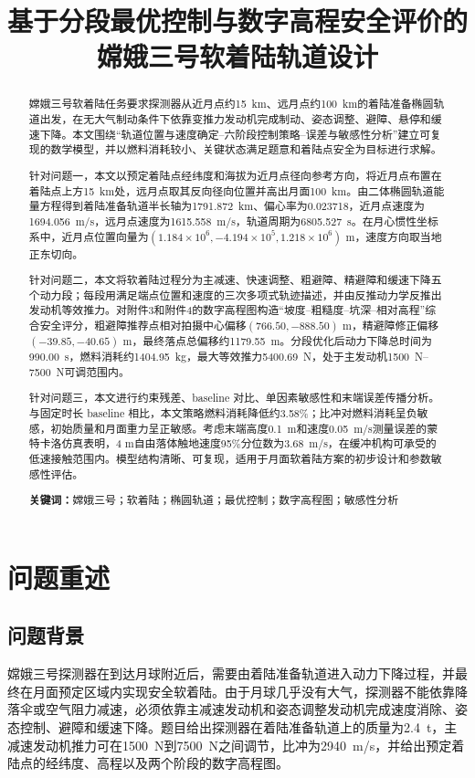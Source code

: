 \documentclass[UTF8,a4paper,12pt]{ctexart}
\title{\heiti 基于分段最优控制与数字高程安全评价的\\嫦娥三号软着陆轨道设计}
\author{}
\date{}
\begin{document}
\maketitle
\thispagestyle{empty}

\begin{abstract}
嫦娥三号软着陆任务要求探测器从近月点约\SI{15}{km}、远月点约\SI{100}{km}的着陆准备椭圆轨道出发，在无大气制动条件下依靠变推力发动机完成制动、姿态调整、避障、悬停和缓速下降。本文围绕``轨道位置与速度确定--六阶段控制策略--误差与敏感性分析''建立可复现的数学模型，并以燃料消耗较小、关键状态满足题意和着陆点安全为目标进行求解。

针对问题一，本文以预定着陆点经纬度和海拔为近月点径向参考方向，将近月点布置在着陆点上方\SI{15}{km}处，远月点取其反向径向位置并高出月面\SI{100}{km}。由二体椭圆轨道能量方程得到着陆准备轨道半长轴为\SI{1791.872}{km}、偏心率为0.023718，近月点速度为\SI{1694.056}{m/s}，远月点速度为\SI{1615.558}{m/s}，轨道周期为\SI{6805.527}{s}。在月心惯性坐标系中，近月点位置向量为$(1.184\times10^6,-4.194\times10^5,1.218\times10^6)$ m，速度方向取当地正东切向。

针对问题二，本文将软着陆过程分为主减速、快速调整、粗避障、精避障和缓速下降五个动力段；每段用满足端点位置和速度的三次多项式轨迹描述，并由反推动力学反推出发动机等效推力。对附件3和附件4的数字高程图构造``坡度--粗糙度--坑深--相对高程''综合安全评分，粗避障推荐点相对拍摄中心偏移$(766.50,-888.50)$ m，精避障修正偏移$(-39.85,-40.65)$ m，最终落点总偏移约\SI{1179.55}{m}。分段优化后动力下降总时间为\SI{990.00}{s}，燃料消耗约\SI{1404.95}{kg}，最大等效推力\SI{5400.69}{N}，处于主发动机\SI{1500}{N}--\SI{7500}{N}可调范围内。

针对问题三，本文进行约束残差、baseline 对比、单因素敏感性和末端误差传播分析。与固定时长 baseline 相比，本文策略燃料消耗降低约3.58\%；比冲对燃料消耗呈负敏感，初始质量和月面重力呈正敏感。考虑末端高度\SI{0.1}{m}和速度\SI{0.05}{m/s}测量误差的蒙特卡洛仿真表明，4 m自由落体触地速度95\%分位数为\SI{3.68}{m/s}，在缓冲机构可承受的低速接触范围内。模型结构清晰、可复现，适用于月面软着陆方案的初步设计和参数敏感性评估。

\textbf{关键词：}嫦娥三号；软着陆；椭圆轨道；最优控制；数字高程图；敏感性分析
\end{abstract}
\newpage
\tableofcontents
\newpage

\section{问题重述}
\subsection{问题背景}
嫦娥三号探测器在到达月球附近后，需要由着陆准备轨道进入动力下降过程，并最终在月面预定区域内实现安全软着陆。由于月球几乎没有大气，探测器不能依靠降落伞或空气阻力减速，必须依靠主减速发动机和姿态调整发动机完成速度消除、姿态控制、避障和缓速下降。题目给出探测器在着陆准备轨道上的质量为\SI{2.4}{t}，主减速发动机推力可在\SI{1500}{N}到\SI{7500}{N}之间调节，比冲为\SI{2940}{m/s}，并给出预定着陆点的经纬度、高程以及两个阶段的数字高程图。
\end{document}
